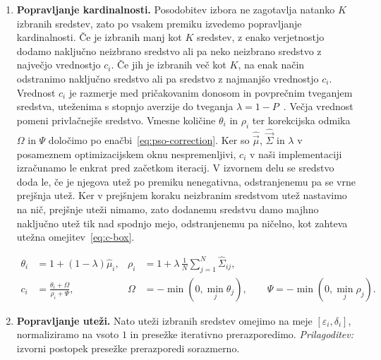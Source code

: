 \documentclass[9pt]{style/friteza}
\begin{document}
\begin{enumerate}
    \item \textbf{Popravljanje kardinalnosti.}
    Posodobitev izbora ne zagotavlja natanko $K$ izbranih sredstev, zato po vsakem premiku izvedemo popravljanje kardinalnosti. Če je izbranih manj kot $K$ sredstev, z enako verjetnostjo dodamo naključno neizbrano sredstvo ali pa neko neizbrano sredstvo z največjo vrednostjo $c_i$. Če jih je izbranih več kot $K$, na enak način odstranimo naključno sredstvo ali pa sredstvo z najmanjšo vrednostjo $c_i$. Vrednost $c_i$ je razmerje med pričakovanim donosom in povprečnim tveganjem sredstva, uteženima s stopnjo averzije do tveganja $\lambda=1-P$~\cite{cura2009}. Večja vrednost pomeni privlačnejše sredstvo. Vmesne količine $\theta_i$ in $\rho_i$ ter korekcijska odmika $\Omega$ in $\Psi$ določimo po enačbi~\eqref{eq:pso-correction}. Ker so $\hat{\vec{\mu}}$, $\hat{\vec{\Sigma}}$ in $\lambda$ v posameznem optimizacijskem oknu nespremenljivi, $c_i$ v naši implementaciji izračunamo le enkrat pred začetkom iteracij. V izvornem delu se sredstvo doda le, če je njegova utež po premiku nenegativna, odstranjenemu pa se vrne prejšnja utež. Ker v prejšnjem koraku neizbranim sredstvom utež nastavimo na nič, prejšnje uteži nimamo, zato dodanemu sredstvu damo majhno naključno utež tik nad spodnjo mejo, odstranjenemu pa ničelno, kot zahteva utežna omejitev~\eqref{eq:c-box}. 

    \begin{equation}
    \label{eq:pso-correction}
    \begin{aligned}
    \theta_i &= 1+(1-\lambda)\hat{\mu}_i,
    &
    \rho_i &= 1+\lambda\,\tfrac{1}{N}\textstyle\sum_{j=1}^{N}\hat{\Sigma}_{ij},
    \\
    c_i &= \tfrac{\theta_i+\Omega}{\rho_i+\Psi},
    &
    \Omega &= -\min\left(0,\min_j\theta_j\right),
    \qquad
    \Psi = -\min\left(0,\min_j\rho_j\right).
    \end{aligned}
    \end{equation}

    \item \textbf{Popravljanje uteži.}
    Nato uteži izbranih sredstev omejimo na meje $[\varepsilon_i,\delta_i]$, normaliziramo na vsoto $1$ in presežke iterativno prerazporedimo. \emph{Prilagoditev:} izvorni postopek presežke prerazporedi sorazmerno.
\end{enumerate}
\end{document}
